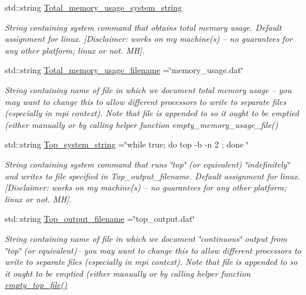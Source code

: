 \begin{DoxyCompactItemize}
std\+::string \hyperlink{namespaceoomph_1_1MemoryUsage_a9b915316a3658a60e8fa86490c8d013a}{Total\+\_\+memory\+\_\+usage\+\_\+system\+\_\+string}
\begin{DoxyCompactList}\small\item\em String containing system command that obtains total memory usage. Default assignment for linux. \mbox{[}Disclaimer\+: works on my machine(s) -- no guarantees for any other platform; linux or not. MH\mbox{]}. \end{DoxyCompactList}\item 
std\+::string \hyperlink{namespaceoomph_1_1MemoryUsage_afd9a74c901df404ddb665921e408a3a3}{Total\+\_\+memory\+\_\+usage\+\_\+filename} =\char`\"{}memory\+\_\+usage.\+dat\char`\"{}
\begin{DoxyCompactList}\small\item\em String containing name of file in which we document total memory usage -- you may want to change this to allow different processors to write to separate files (especially in mpi context). Note that file is appended to so it ought to be emptied (either manually or by calling helper function empty\+\_\+memory\+\_\+usage\+\_\+file() \end{DoxyCompactList}\item 
std\+::string \hyperlink{namespaceoomph_1_1MemoryUsage_a61c07afc6531dcc4f77ae2f2b738383f}{Top\+\_\+system\+\_\+string} =\char`\"{}while true; do top -\/b -\/n 2 ; done \char`\"{}
\begin{DoxyCompactList}\small\item\em String containing system command that runs \char`\"{}top\char`\"{} (or equivalent) \char`\"{}indefinitely\char`\"{} and writes to file specified in Top\+\_\+output\+\_\+filename. Default assignment for linux. \mbox{[}Disclaimer\+: works on my machine(s) -- no guarantees for any other platform; linux or not. MH\mbox{]}. \end{DoxyCompactList}\item 
std\+::string \hyperlink{namespaceoomph_1_1MemoryUsage_a03231c21b4d9a8b4a08cecc3d688c7d3}{Top\+\_\+output\+\_\+filename} =\char`\"{}top\+\_\+output.\+dat\char`\"{}
\begin{DoxyCompactList}\small\item\em String containing name of file in which we document \char`\"{}continuous\char`\"{} output from \char`\"{}top\char`\"{} (or equivalent)-- you may want to change this to allow different processors to write to separate files (especially in mpi context). Note that file is appended to so it ought to be emptied (either manually or by calling helper function \hyperlink{namespaceoomph_1_1MemoryUsage_a0034019640ac5f6ffe7e8e40fae1e453}{empty\+\_\+top\+\_\+file()} \end{DoxyCompactList}\end{DoxyCompactItemize}


